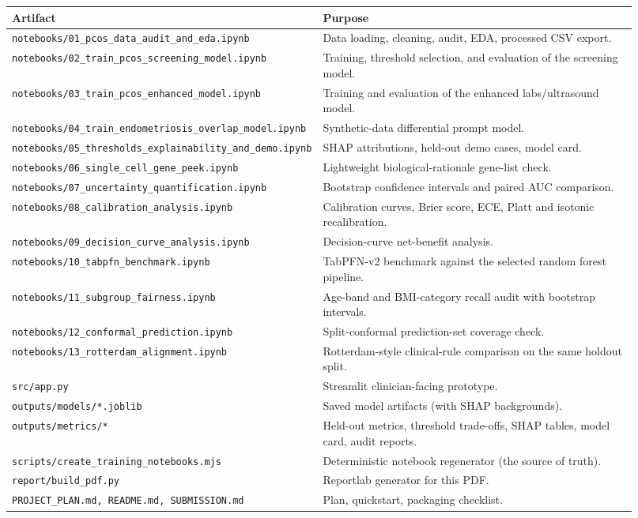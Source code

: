 \documentclass[11pt]{article}
\newcommand{\code}[1]{\texttt{\small #1}}
\begin{document}
\begin{longtable}{p{0.34\linewidth}p{0.58\linewidth}}
\toprule
Artifact & Purpose \\
\midrule
\code{notebooks/01\_pcos\_data\_audit\_and\_eda.ipynb} & Data loading, cleaning, audit, EDA, processed CSV export. \\
\code{notebooks/02\_train\_pcos\_screening\_model.ipynb} & Training, threshold selection, and evaluation of the screening model. \\
\code{notebooks/03\_train\_pcos\_enhanced\_model.ipynb} & Training and evaluation of the enhanced labs/ultrasound model. \\
\code{notebooks/04\_train\_endometriosis\_overlap\_model.ipynb} & Synthetic-data differential prompt model. \\
\code{notebooks/05\_thresholds\_explainability\_and\_demo.ipynb} & SHAP attributions, held-out demo cases, model card. \\
\code{notebooks/06\_single\_cell\_gene\_peek.ipynb} & Lightweight biological-rationale gene-list check. \\
\code{notebooks/07\_uncertainty\_quantification.ipynb} & Bootstrap confidence intervals and paired AUC comparison. \\
\code{notebooks/08\_calibration\_analysis.ipynb} & Calibration curves, Brier score, ECE, Platt and isotonic recalibration. \\
\code{notebooks/09\_decision\_curve\_analysis.ipynb} & Decision-curve net-benefit analysis. \\
\code{notebooks/10\_tabpfn\_benchmark.ipynb} & TabPFN-v2 benchmark against the selected random forest pipeline. \\
\code{notebooks/11\_subgroup\_fairness.ipynb} & Age-band and BMI-category recall audit with bootstrap intervals. \\
\code{notebooks/12\_conformal\_prediction.ipynb} & Split-conformal prediction-set coverage check. \\
\code{notebooks/13\_rotterdam\_alignment.ipynb} & Rotterdam-style clinical-rule comparison on the same holdout split. \\
\code{src/app.py} & Streamlit clinician-facing prototype. \\
\code{outputs/models/*.joblib} & Saved model artifacts (with SHAP backgrounds). \\
\code{outputs/metrics/*} & Held-out metrics, threshold trade-offs, SHAP tables, model card, audit reports. \\
\code{scripts/create\_training\_notebooks.mjs} & Deterministic notebook regenerator (the source of truth). \\
\code{report/build\_pdf.py} & Reportlab generator for this PDF. \\
\code{PROJECT\_PLAN.md, README.md, SUBMISSION.md} & Plan, quickstart, packaging checklist. \\
\bottomrule
\end{longtable}
\end{document}

